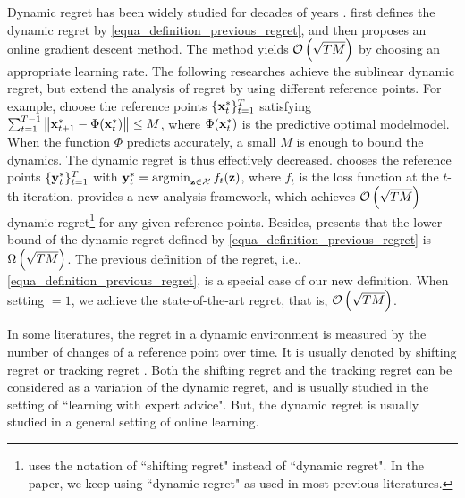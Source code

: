 \documentclass{article}
\begin{document}
Dynamic regret has been widely studied for decades of years \citep{Zinkevich:2003,Hall:2015ct,Hall:2013vr,Jadbabaie:2015wg,Yang:2016ud,Bedi:2018te,Zhang:2016wl,Mokhtari:2016jz,Zhang:2018tu,Gyorgy:2016,NIPS2016_6536,Zhao:2018wx}.   \citet{Zinkevich:2003} first defines the dynamic regret by \eqref{equa_definition_previous_regret}, and then proposes an online gradient descent method. The method yields ${\mathcal{O}\left( \sqrt{TM} \right)}$ by choosing an appropriate learning rate. The following researches achieve the sublinear dynamic regret, but extend the analysis of regret by using different reference points. For example, \citet{Hall:2015ct,Hall:2013vr} choose the reference points $\{{\bf x}_t^{\ast}\}_{t=1}^T$ satisfying $\sum_{t=1}^{T-1} \left\lVert{\bf x}_{t+1}^\ast - \Phi({\bf x}_t^\ast)\right\rVert \le M$, where $\Phi({\bf x}_t^\ast)$ is the predictive optimal modelmodel. When the function $\Phi$ predicts accurately, a small $M$ is enough to bound the dynamics. The dynamic regret is thus effectively decreased. \citet{Jadbabaie:2015wg,Yang:2016ud,Bedi:2018te,Zhang:2016wl,Mokhtari:2016jz,Zhang:2018tu} chooses the reference points $\{{\bf y}_t^{\ast}\}_{t=1}^T$ with $\y_t^{\ast} = \argmin_{\z\in\Xcal} f_t(\z)$, where $f_t$ is the loss function at the $t$-th iteration. \citet{Gyorgy:2016} provides a new analysis framework, which achieves ${\mathcal{O}\left( \sqrt{TM} \right)}$ dynamic regret\footnote{\citet{Gyorgy:2016} uses the notation of ``shifting regret" instead of ``dynamic regret". In the paper, we keep using ``dynamic regret" as used in most previous literatures. } for any given reference points. Besides, \citet{Zhao:2018wx} presents that the lower bound of the dynamic regret defined by \ref{equa_definition_previous_regret} is $\Omega\left( \sqrt{TM} \right)$. The previous definition of the regret, i.e., \eqref{equa_definition_previous_regret}, is a special case of our new definition. When setting $  = 1$, we achieve the state-of-the-art regret, that is, ${\mathcal{O}\left( \sqrt{TM} \right)}$. 

In some literatures, the regret in a dynamic environment is measured by the number of changes of a reference point over time. It is usually denoted by shifting regret or tracking regret \citep{Herbster1998,Gyorgy:2005wo,Gyorgy:2012wa,Gyorgy:2016,Mourtada:2017vn,JMLR:v17:13-533,NIPS2016_6536,cesabianchi:hal,pmlr-v84-mohri18a,pmlr-v54-jun17a}. Both the shifting regret and the tracking regret can be considered as a variation of the dynamic regret, and is usually studied in the setting of ``learning with expert advice". But, the dynamic regret is usually studied in a general setting of online learning.
\end{document}
